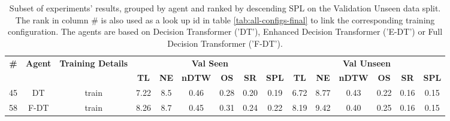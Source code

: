 \begin{table}
\centering
\caption{\label{tab:rezero}Subset of experiments' results, grouped by agent and ranked by descending SPL on the Validation Unseen data split. The rank in column \# is also used as a look up id in table \ref{tab:all-configs-final} to link the corresponding training configuration.     \newline The agents are based on Decision Transformer ('DT'), Enhanced Decision Transformer ('E-DT') or Full Decision Transformer ('F-DT').}
\begin{tabular}{@{\hskip3pt}c@{\hskip3pt}c@{\hskip3pt}c@{\hskip3pt}c@{\hskip3pt}c@{\hskip3pt}c@{\hskip3pt}c@{\hskip3pt}c@{\hskip3pt}c@{\hskip3pt}c@{\hskip3pt}c@{\hskip3pt}c@{\hskip3pt}c@{\hskip3pt}c@{\hskip3pt}c}
\toprule
\textbf{\#} & \textbf{Agent} & \textbf{Training Details} & \multicolumn{6}{c}{\textbf{Val Seen}} & \multicolumn{6}{c}{\textbf{Val Unseen}} \\
 \textbf{~} &     \textbf{~} &                \textbf{~} &       \textbf{TL} & \textbf{NE} & \textbf{nDTW} & \textbf{OS} & \textbf{SR} & \textbf{SPL} &         \textbf{TL} & \textbf{NE} & \textbf{nDTW} & \textbf{OS} & \textbf{SR} & \textbf{SPL} \\
\midrule
         45 &             DT &                     train &              7.22 &         8.5 &          0.46 &        0.28 &        0.20 &         0.19 &                6.72 &        8.77 &          0.43 &        0.22 &        0.16 &         0.15 \\
         58 &           F-DT &                     train &              8.26 &         8.7 &          0.45 &        0.31 &        0.24 &         0.22 &                8.19 &        9.42 &          0.40 &        0.25 &        0.16 &         0.15 \\
\bottomrule
\end{tabular}
\end{table}
